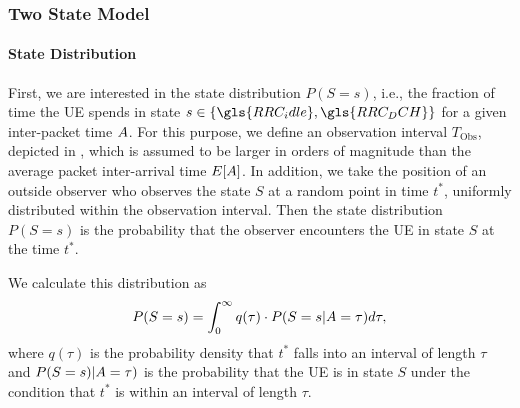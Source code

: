 \subsubsection*{Two State Model}\label{sec:network:performance_model:analytical_model:two_states}

\newcommand{\RRCState}{S}
\newcommand{\PacketIATDensity}{a}
\newcommand{\RRCStateRealization}{s}
\newcommand{\ObservationInterval}{T_{\text{Obs}}}
\newcommand{\ObservationPoint}{t^*}
\newcommand{\ObservationIntervalDensity}{q}
\newcommand{\ObservationIntervalLength}{\tau}
\newcommand{\NormalisationConstant}{c_0}
\newcommand{\NObservedPackets}{n_{\text{P}}}

\paragraph*{State Distribution}
First, we are interested in the state distribution \(P(\RRCState=\RRCStateRealization)\), i.e., the fraction of time the \gls{UE} spends in state \(\RRCStateRealization\in\{\gls{RRC_idle},\gls{RRC_DCH}\}\) for a given inter-packet time \(A\).
For this purpose, we define an observation interval \(\ObservationInterval\), depicted in , which is assumed to be larger in orders of magnitude than the average packet inter-arrival time \(E[A]\).
In addition, we take the position of an outside observer who observes the state \(\RRCState\) at a random point in time \(\ObservationPoint\), uniformly distributed within the observation interval. 
Then the state distribution \(P(\RRCState=\RRCStateRealization)\) is the probability that the observer encounters the \gls{UE} in state \(\RRCState\) at the time \(\ObservationPoint\). 

We calculate this distribution as 
\begin{equation}
P(\RRCState=\RRCStateRealization)= 
  \int_{0}^\infty \ObservationIntervalDensity(\tau) \cdot 
  P(\RRCState=\RRCStateRealization \vert \PacketIAT = \ObservationIntervalLength) d\ObservationIntervalLength,
  \label{eq:network:performance_model:system_description:state_distribution} 
\end{equation} 
where \(\ObservationIntervalDensity(\ObservationIntervalLength)\) is the probability density that \(\ObservationPoint\) falls into an interval of length \(\ObservationIntervalLength\) and 
\(P(\RRCState=\RRCStateRealization) \vert \PacketIAT = \ObservationIntervalLength)\)
is the probability that the \gls{UE} is in state \(\RRCState\) under the condition that \(\ObservationPoint\) is within an interval of length \(\ObservationIntervalLength\).

